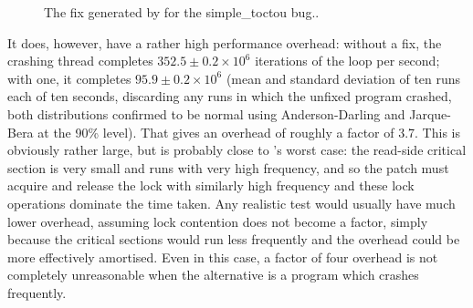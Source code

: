 \begin{figure}
  \hfill %
  \hfill
  \caption{The fix generated by {\implementation} for the simple\_toctou bug..}
  \label{fig:eval:simple_toctou:fix}
\end{figure}

It does, however, have a rather high performance overhead: without a
fix, the crashing thread completes $352.5 \pm 0.2
{\times} 10^6$ iterations of the loop per second; with one, it
completes $95.9 \pm 0.2 {\times} 10^6$ (mean and
standard deviation of ten runs each of ten seconds, discarding any
runs in which the unfixed program crashed, both distributions
confirmed to be normal using Anderson-Darling and Jarque-Bera at the
90\% level).  That gives an overhead of roughly a factor of 3.7.  This
is obviously rather large, but is probably close to {\technique}'s
worst case: the read-side critical section is very small and runs with
very high frequency, and so the patch must acquire and release the
lock with similarly high frequency and these lock operations dominate
the time taken.  Any realistic test would usually have much lower
overhead, assuming lock contention does not become a factor, simply
because the critical sections would run less frequently and the
overhead could be more effectively amortised.  Even in this case, a
factor of four overhead is not completely unreasonable when the
alternative is a program which crashes frequently.

